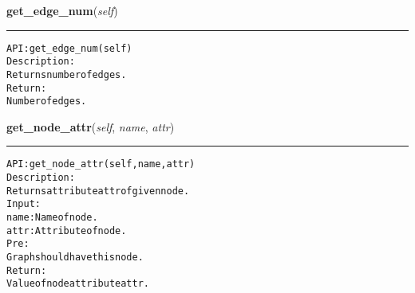     \vspace{0.5ex}

\hspace{.8\funcindent}\begin{boxedminipage}{\funcwidth}

    \raggedright \textbf{get\_edge\_num}(\textit{self})

    \vspace{-1.5ex}

    \rule{\textwidth}{0.5\fboxrule}
\setlength{\parskip}{2ex}
\begin{alltt}

API: get\_edge\_num(self)
Description:
Returns number of edges.
Return:
    Number of edges.
\end{alltt}

\setlength{\parskip}{1ex}
    \end{boxedminipage}

    \label{coinor:gimpy:graph:Graph:get_node_attr}

    \vspace{0.5ex}

\hspace{.8\funcindent}\begin{boxedminipage}{\funcwidth}

    \raggedright \textbf{get\_node\_attr}(\textit{self}, \textit{name}, \textit{attr})

    \vspace{-1.5ex}

    \rule{\textwidth}{0.5\fboxrule}
\setlength{\parskip}{2ex}
\begin{alltt}

API: get\_node\_attr(self, name, attr)
Description:
Returns attribute attr of given node.
Input:
    name: Name of node.
    attr: Attribute of node.
Pre:
    Graph should have this node.
Return:
    Value of node attribute attr.
\end{alltt}

\setlength{\parskip}{1ex}
    \end{boxedminipage}

    \label{coinor:gimpy:graph:Graph:get_edge_attr}

